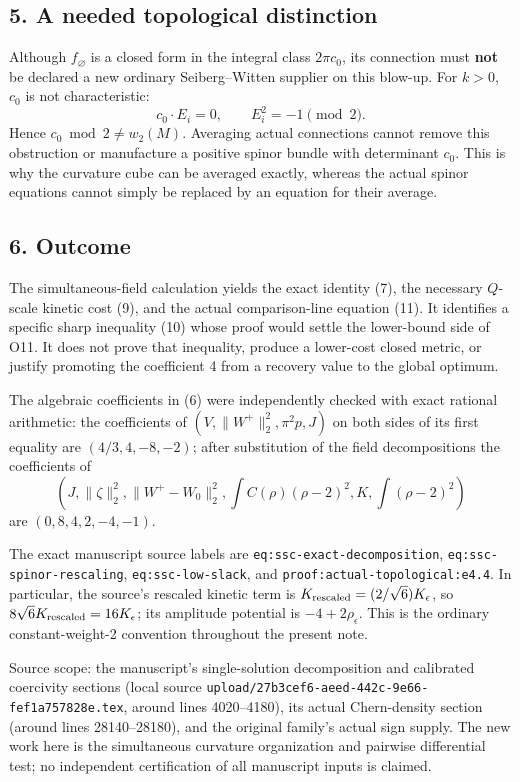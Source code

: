 \documentclass[
]{article}
\begin{document}
\hypertarget{a-needed-topological-distinction}{%
\subsection{5. A needed topological
distinction}\label{a-needed-topological-distinction}}

Although \(f_\varnothing\) is a closed form in the integral class
\(2\pi c_0\), its connection must \textbf{not} be declared a new
ordinary Seiberg--Witten supplier on this blow-up. For \(k>0\), \(c_0\)
is not characteristic: \[
c_0\cdot E_i=0,
\qquad E_i^2=-1\pmod2.
\] Hence \(c_0\bmod2\ne w_2(M)\). Averaging actual connections cannot
remove this obstruction or manufacture a positive spinor bundle with
determinant \(c_0\). This is why the curvature cube can be averaged
exactly, whereas the actual spinor equations cannot simply be replaced
by an equation for their average.

\hypertarget{outcome}{%
\subsection{6. Outcome}\label{outcome}}

The simultaneous-field calculation yields the exact identity (7), the
necessary \(Q\)-scale kinetic cost (9), and the actual comparison-line
equation (11). It identifies a specific sharp inequality (10) whose
proof would settle the lower-bound side of O11. It does not prove that
inequality, produce a lower-cost closed metric, or justify promoting the
coefficient 4 from a recovery value to the global optimum.

The algebraic coefficients in (6) were independently checked with exact
rational arithmetic: the coefficients of \((V,\|W^+\|_2^2,\pi^2p,J)\) on
both sides of its first equality are \((4/3,4,-8,-2)\); after
substitution of the field decompositions the coefficients of
\[(J,\|\zeta\|_2^2,\|W^+-W_0\|_2^2,\int C(\rho)(\rho-2)^2,K,\int(\rho-2)^2)\]
are \((0,8,4,2,-4,-1)\).

The exact manuscript source labels are
\texttt{eq:ssc-exact-decomposition}, \texttt{eq:ssc-spinor-rescaling},
\texttt{eq:ssc-low-slack}, and \texttt{proof:actual-topological:e4.4}.
In particular, the source's rescaled kinetic term is
\(K_{\rm rescaled}=(2/\sqrt6)K_\epsilon\), so
\(8\sqrt6K_{\rm rescaled}=16K_\epsilon\); its amplitude potential is
\(-4+2\rho_\epsilon\). This is the ordinary constant-weight-2 convention
throughout the present note.

Source scope: the manuscript's single-solution decomposition and
calibrated coercivity sections (local source
\texttt{upload/27b3cef6-aeed-442c-9e66-fef1a757828e.tex}, around lines
4020--4180), its actual Chern-density section (around lines
28140--28180), and the original family's actual sign supply. The new
work here is the simultaneous curvature organization and pairwise
differential test; no independent certification of all manuscript inputs
is claimed.
\end{document}
